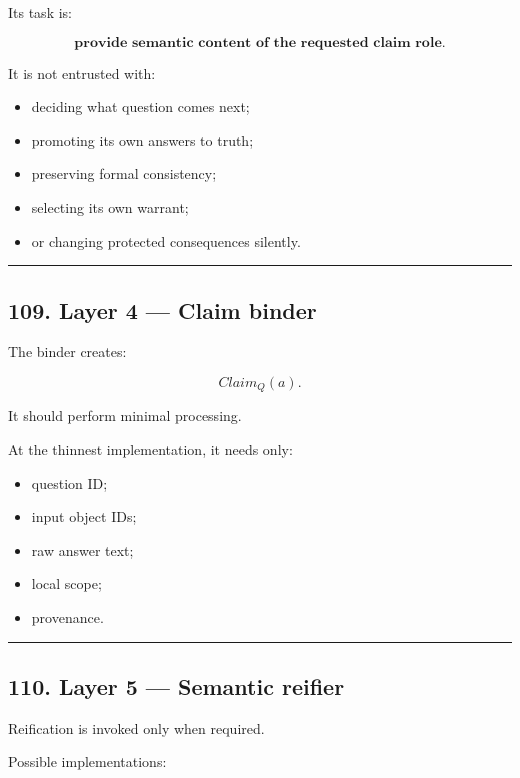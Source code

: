 \documentclass[
]{article}
\providecommand{\tightlist}{%
  \setlength{\itemsep}{0pt}\setlength{\parskip}{0pt}}
\begin{document}
Its task is:

\[
\boxed{
\textbf{provide semantic content of the requested claim role.}
}
\]

It is not entrusted with:

\begin{itemize}
\tightlist
\item
  deciding what question comes next;
\item
  promoting its own answers to truth;
\item
  preserving formal consistency;
\item
  selecting its own warrant;
\item
  or changing protected consequences silently.
\end{itemize}

\begin{center}\rule{0.5\linewidth}{0.5pt}\end{center}

\subsection{109. Layer 4 --- Claim binder}\label{layer-4-claim-binder}

The binder creates:

\[
Claim_Q(a).
\]

It should perform minimal processing.

At the thinnest implementation, it needs only:

\begin{itemize}
\tightlist
\item
  question ID;
\item
  input object IDs;
\item
  raw answer text;
\item
  local scope;
\item
  provenance.
\end{itemize}

\begin{center}\rule{0.5\linewidth}{0.5pt}\end{center}

\subsection{110. Layer 5 --- Semantic
reifier}\label{layer-5-semantic-reifier}

Reification is invoked only when required.

Possible implementations:
\end{document}
